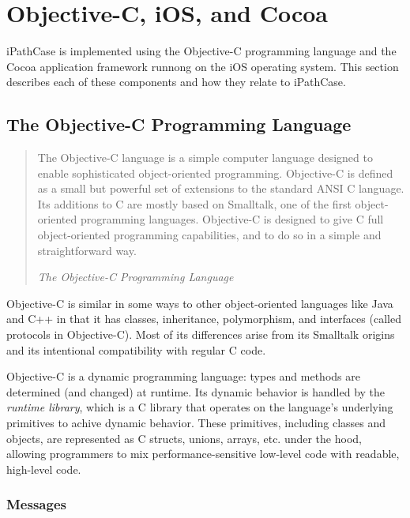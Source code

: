 \section{Objective-C, iOS, and Cocoa}
\label{sect:objc}

iPathCase is implemented using the Objective-C programming language and the
Cocoa application framework runnong on the iOS operating system. This section
describes each of these components and how they relate to iPathCase.

\subsection{The Objective-C Programming Language}
\label{sect:objc_objc}

\begin{quote}

    The Objective-C language is a simple computer language designed to enable
    sophisticated object-oriented programming. Objective-C is defined as a small
    but powerful set of extensions to the standard ANSI C language. Its
    additions to C are mostly based on Smalltalk, one of the first
    object-oriented programming languages. Objective-C is designed to give C
    full object-oriented programming capabilities, and to do so in a simple and
    straightforward way.

    \raggedleft \em The Objective-C Programming Language \cite{objc:manual}

\end{quote}

Objective-C is similar in some ways to other object-oriented languages like Java
and C++ in that it has classes, inheritance, polymorphism, and interfaces
(called protocols in Objective-C). Most of its differences arise from its
Smalltalk origins and its intentional compatibility with regular C code.

Objective-C is a dynamic programming language: types and methods are determined
(and changed) at runtime. Its dynamic behavior is handled by the \emph{runtime
library}, which is a C library that operates on the language's underlying
primitives to achive dynamic behavior. These primitives, including classes and
objects, are represented as C structs, unions, arrays, etc. under the hood,
allowing programmers to mix performance-sensitive low-level code with readable,
high-level code.

\subsubsection{Messages}
\label{sect:objc_messages}

